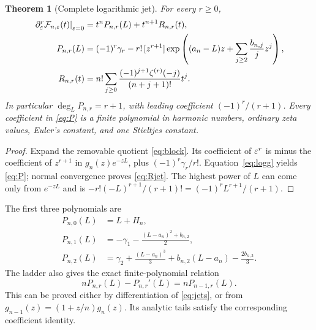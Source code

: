 \documentclass[11pt,a4paper]{article}
\numberwithin{equation}{section}
\newtheorem{theorem}{Theorem}[section]
\theoremstyle{definition}\newtheorem{definition}[theorem]{Definition}
\theoremstyle{remark}\newtheorem{remark}[theorem]{Remark}
\newcommand{\F}{\mathcal F}\newcommand{\B}{\mathcal B}
\begin{document}
\begin{theorem}[Complete logarithmic jet]\label{thm:jets}
For every $r\ge0$,
\begin{align}
 \left.\partial_\eps^r\F_{n,\eps}(t)\right|_{\eps=0}
 &=t^nP_{n,r}(L)+t^{n+1}R_{n,r}(t),\label{eq:jets}\\
 P_{n,r}(L)&=(-1)^r\gamma_r-r!\,[z^{r+1}]
 \exp\left((a_n-L)z+\sum_{j\ge2}\frac{b_{n,j}}jz^j\right),\label{eq:P}\\
 R_{n,r}(t)&=n!\sum_{j\ge0}
       \frac{(-1)^{j+1}\zeta^{(r)}(-j)}{(n+j+1)!}t^j.
 \label{eq:Rjet}
\end{align}
In particular $\deg_LP_{n,r}=r+1$, with leading coefficient
$(-1)^r/(r+1)$. Every coefficient in \eqref{eq:P} is a finite polynomial
in harmonic numbers, ordinary zeta values, Euler's constant, and one
Stieltjes constant.
\end{theorem}
\begin{proof}
Expand the removable quotient \eqref{eq:block}. Its coefficient of
$\varepsilon^r$ is minus the coefficient of $z^{r+1}$ in $g_n(z)e^{-zL}$,
plus $(-1)^r\gamma_r/r!$. Equation~\eqref{eq:logg} yields \eqref{eq:P};
normal convergence proves \eqref{eq:Rjet}. The highest power of $L$ can
come only from $e^{-zL}$ and is
$-r!(-L)^{r+1}/(r+1)!=(-1)^rL^{r+1}/(r+1)$.
\end{proof}
The first three polynomials are
\begin{align}
 P_{n,0}(L)&=L+H_n,\label{eq:jetexamples0}\\
 P_{n,1}(L)&=-\gamma_1-\frac{(L-a_n)^2+b_{n,2}}2,\label{eq:jetexamples1}\\
 P_{n,2}(L)&=\gamma_2+\frac{(L-a_n)^3}{3}
          +b_{n,2}(L-a_n)-\frac{2b_{n,3}}3.\label{eq:jetexamples2}
\end{align}
The ladder also gives the exact finite-polynomial relation
\begin{equation}\label{eq:Pladder}
 nP_{n,r}(L)-P_{n,r}'(L)=nP_{n-1,r}(L).
\end{equation}
This can be proved either by differentiation of \eqref{eq:jets}, or from
$g_{n-1}(z)=(1+z/n)g_n(z)$. Its analytic tails satisfy the corresponding
coefficient identity.
\end{document}
